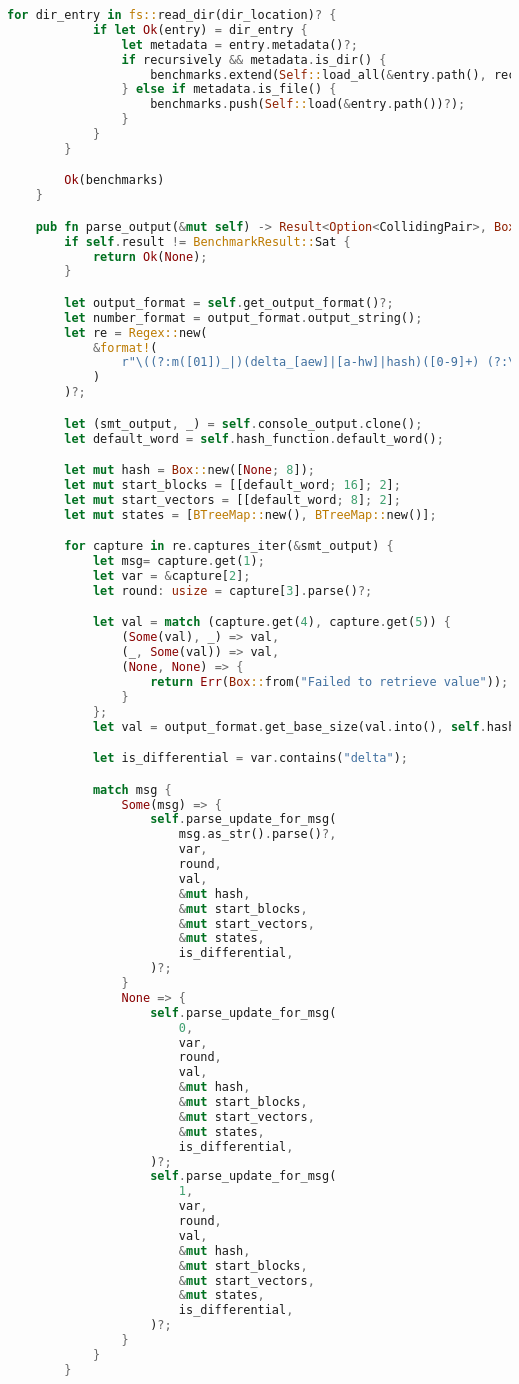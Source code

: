\begin{lstlisting}[language=rust, caption={structs/benchmark.rs}]
		for dir_entry in fs::read_dir(dir_location)? {
			if let Ok(entry) = dir_entry {
				let metadata = entry.metadata()?;
				if recursively && metadata.is_dir() {
					benchmarks.extend(Self::load_all(&entry.path(), recursively)?)
				} else if metadata.is_file() {
					benchmarks.push(Self::load(&entry.path())?);
				}
			}
		}

		Ok(benchmarks)
	}

	pub fn parse_output(&mut self) -> Result<Option<CollidingPair>, Box<dyn Error>> {
		if self.result != BenchmarkResult::Sat {
			return Ok(None);
		}

		let output_format = self.get_output_format()?;
		let number_format = output_format.output_string();
		let re = Regex::new(
			&format!(
				r"\((?:m([01])_|)(delta_[aew]|[a-hw]|hash)([0-9]+) (?:\(_ bv{number_format} (?:32|64)\)|{number_format})\)",
			)
		)?;

		let (smt_output, _) = self.console_output.clone();
		let default_word = self.hash_function.default_word();

		let mut hash = Box::new([None; 8]);
		let mut start_blocks = [[default_word; 16]; 2];
		let mut start_vectors = [[default_word; 8]; 2];
		let mut states = [BTreeMap::new(), BTreeMap::new()];

		for capture in re.captures_iter(&smt_output) {
			let msg= capture.get(1);
			let var = &capture[2];
			let round: usize = capture[3].parse()?;

			let val = match (capture.get(4), capture.get(5)) {
				(Some(val), _) => val,
				(_, Some(val)) => val,
				(None, None) => {
					return Err(Box::from("Failed to retrieve value"));
				}
			};
			let val = output_format.get_base_size(val.into(), self.hash_function)?;

			let is_differential = var.contains("delta");

			match msg {
				Some(msg) => {
					self.parse_update_for_msg(
						msg.as_str().parse()?,
						var,
						round,
						val,
						&mut hash,
						&mut start_blocks,
						&mut start_vectors,
						&mut states,
						is_differential,
					)?;
				}
				None => {
					self.parse_update_for_msg(
						0,
						var,
						round,
						val,
						&mut hash,
						&mut start_blocks,
						&mut start_vectors,
						&mut states,
						is_differential,
					)?;
					self.parse_update_for_msg(
						1,
						var,
						round,
						val,
						&mut hash,
						&mut start_blocks,
						&mut start_vectors,
						&mut states,
						is_differential,
					)?;
				}
			}
		}


\end{lstlisting}
